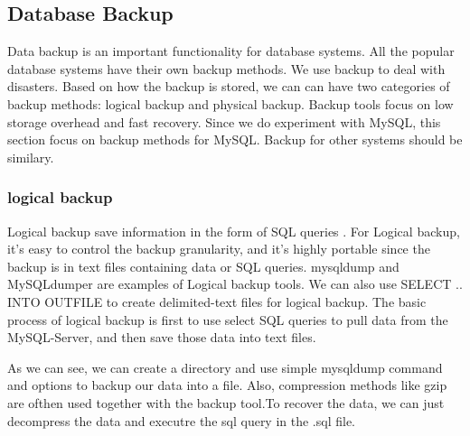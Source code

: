 \subsection{Database Backup}

Data backup is an important functionality for database systems. All the popular database systems have their own backup methods. We use backup to deal with disasters. Based on how the backup is stored, we can can have two categories of backup methods: logical backup and physical backup. Backup tools focus on low storage overhead and fast recovery. Since we do experiment with MySQL, this section focus on backup methods for MySQL. Backup for other systems should be similary.



\subsubsection{logical backup}

Logical backup save information in the form of SQL queries \citep{mysqlbackupdocumentation}.  For Logical backup, it's easy to control the backup granularity, and it's highly portable since the backup is in text files containing data or SQL queries. mysqldump \citep{mysqldump-doc} and MySQLdumper\citep{mysqldumpper} are examples of Logical backup tools. We can also use SELECT .. INTO OUTFILE to create delimited-text files for logical backup. The basic process of logical backup is first to use select SQL queries to pull data from the MySQL-Server, and then save those data into text files.






As we can see, we can create a directory and use simple mysqldump command and options to backup our data into a file. Also, compression methods like gzip are ofthen used together with the backup tool.To recover the data, we can just decompress the data and executre the sql query in the .sql file. 

